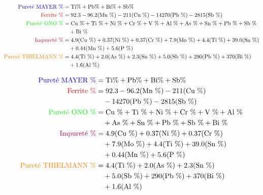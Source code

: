 \documentclass[12pt]{article}
\begin{document}
\begin{align*}
    \textcolor{blue}{\text{Pureté MAYER \%}} &= \text{Ti\%} + \text{Pb\%} + \text{Bi\%} + \text{Sb\%} \\
    \textcolor{red}{\text{Ferrite \%}} &= 92.3 - 96.2 (\text{Mn \%}) - 211 (\text{Cu \%}) - 14270 (\text{Pb \%}) - 2815 (\text{Sb \%}) \\
    \textcolor{green}{\text{Pureté ONO \%}} &= \text{Cu \%} + \text{Ti \%} + \text{Ni \%} + \text{Cr \%} + \text{V \%} + \text{Al \%} + \text{As \%}  + \text{Sn \%} + \text{Pb \%} + \text{Sb \%} \\
    &\quad + \text{Bi \%} \\
    \textcolor{purple}{\text{Impureté \%}} &= 4.9 (\text{Cu \%}) + 0.37 (\text{Ni \%}) + 0.37 (\text{Cr \%})  + 7.9 (\text{Mo \%}) + 4.4 (\text{Ti \%}) + 39.0 (\text{Sn \%}) \\ 
    &\quad + 0.44 (\text{Mn \%}) + 5.6 (\text{P \%}) \\
    \textcolor{orange}{\text{Pureté THIELMANN \%}} &= 4.4 (\text{Ti \%}) + 2.0 (\text{As \%}) + 2.3 (\text{Sn \%}) + 5.0 (\text{Sb \%}) + 290 (\text{Pb \%}) + 370 (\text{Bi \%}) \\
    &\quad + 1.6 (\text{Al \%})
\end{align*}


\begin{align*}
    \textcolor{blue}{\text{Pureté MAYER \%}} &= \text{Ti\%} + \text{Pb\%} + \text{Bi\%} + \text{Sb\%} \\
    \textcolor{red}{\text{Ferrite \%}} &= 92.3 - 96.2 (\text{Mn \%}) - 211 (\text{Cu \%}) \\
    &\quad - 14270 (\text{Pb \%}) - 2815 (\text{Sb \%}) \\
    \textcolor{green}{\text{Pureté ONO \%}} &= \text{Cu \%} + \text{Ti \%} + \text{Ni \%} + \text{Cr \%} + \text{V \%} + \text{Al \%} \\
    &\quad + \text{As \%}  + \text{Sn \%} + \text{Pb \%} + \text{Sb \%} + \text{Bi \%} \\
    \textcolor{purple}{\text{Impureté \%}} &= 4.9 (\text{Cu \%}) + 0.37 (\text{Ni \%}) + 0.37 (\text{Cr \%}) \\
    &\quad + 7.9 (\text{Mo \%}) + 4.4 (\text{Ti \%}) + 39.0 (\text{Sn \%}) \\
    &\quad + 0.44 (\text{Mn \%}) + 5.6 (\text{P \%}) \\
    \textcolor{orange}{\text{Pureté THIELMANN \%}} &= 4.4 (\text{Ti \%}) + 2.0 (\text{As \%}) + 2.3 (\text{Sn \%}) \\
    &\quad + 5.0 (\text{Sb \%}) + 290 (\text{Pb \%}) + 370 (\text{Bi \%}) \\
    &\quad + 1.6 (\text{Al \%})
    \end{align*}
    
\end{document}
